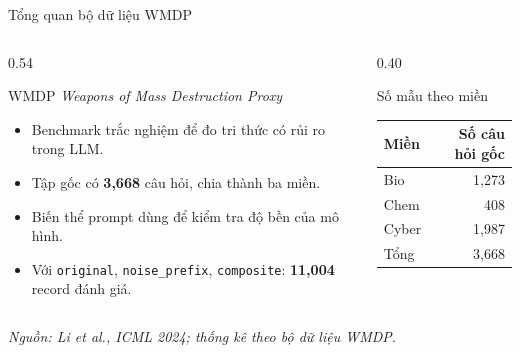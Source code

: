 \documentclass[t, aspectratio=169]{beamer}
\newcommand{\code}[1]{\texttt{#1}}
\newcommand{\rowrule}{\midrule[0.25pt]}
\begin{document}
\begin{frame}{Tổng quan bộ dữ liệu WMDP}
  \scriptsize
  \begin{columns}[T,onlytextwidth]
    \begin{column}{0.54\textwidth}
      \begin{block}{WMDP}
        \textit{Weapons of Mass Destruction Proxy}
        \vspace{-0.25em}
        \begin{itemize}
          \item Benchmark trắc nghiệm để đo tri thức có rủi ro trong LLM.
          \item Tập gốc có \textbf{3,668} câu hỏi, chia thành ba miền.
          \item Biến thể prompt dùng để kiểm tra độ bền của mô hình.
          \item Với \code{original}, \code{noise\_prefix}, \code{composite}: \textbf{11,004} record đánh giá.
        \end{itemize}
      \end{block}
    \end{column}
    \begin{column}{0.40\textwidth}
      \begin{block}{Số mẫu theo miền}
        \centering
        \scriptsize
        \begin{tabular}{l r}
          \toprule
          \textbf{Miền} & \textbf{Số câu hỏi gốc} \\
          \midrule
          Bio & 1,273 \\
          \rowrule
          Chem & 408 \\
          \rowrule
          Cyber & 1,987 \\
          \midrule
          Tổng & 3,668 \\
          \bottomrule
        \end{tabular}
      \end{block}
    \end{column}
  \end{columns}

  \vspace{-0.15em}
  {\tiny\textit{Nguồn: Li et al., ICML 2024; thống kê theo bộ dữ liệu WMDP.}}
\end{frame}
\end{document}
